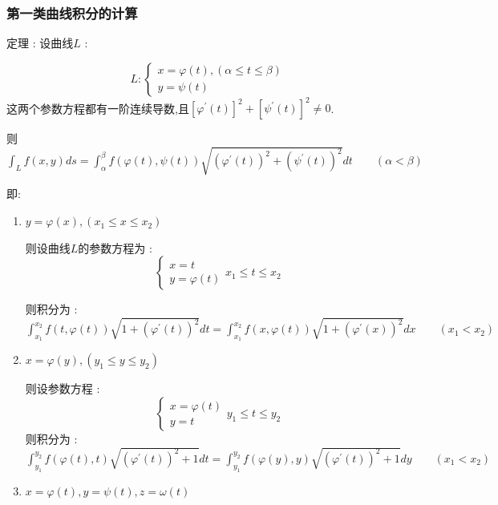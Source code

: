 \documentclass[UTF8,12pt]{ctexbook}
\newcommand{\derivative}{^\prime}
\newcommand{\defFunction}[1]{f(#1)}
\newcommand{\definiteIntegral}[2]{\int^{#1}_{#2}}
\newcommand{\pathIntegral}[1]{\int_{#1}}
\begin{document}
{{{  \subsubsection{第一类曲线积分的计算}{
    定理 : 设曲线$L$ :
    \begin{center}
      $$
        L :
        \begin{cases}
          x = \varphi(t),(\alpha \leq t \leq \beta) \\
          y = \psi(t)
        \end{cases}
      $$
      这两个参数方程都有一阶连续导数,且$\left[\varphi\derivative(t)\right]^2 + \left[\psi\derivative(t)\right]^2 \neq 0$.
    \end{center}

    则$\pathIntegral{L}\defFunction{x,y}ds = \definiteIntegral{\beta}{\alpha}\defFunction{\varphi(t),\psi(t)}\sqrt{(\varphi\derivative(t))^2 + (\psi\derivative(t))^2}dt\qquad (\alpha < \beta)$

    即:
    \begin{enumerate}
      \item {
            $y = \varphi(x),(x_1 \leq x \leq x_2)$

            则设曲线$L$的参数方程为 :
            $$
              \begin{cases}
                x = t \\
                y = \varphi(t)
              \end{cases}
              x_1 \leq t \leq x_2
            $$

            则积分为 : $\definiteIntegral{x_2}{x_1}\defFunction{t,\varphi(t)}\sqrt{1 + (\varphi\derivative(t))^2}dt = \definiteIntegral{x_2}{x_1}\defFunction{x,\varphi(t)}\sqrt{1 + (\varphi\derivative(x))^2}dx\qquad (x_1 < x_2)$
            }
      \item {
            $x = \varphi(y),(y_1 \leq y \leq y_2)$

            则设参数方程 :
            $$
              \begin{cases}
                x = \varphi(t) \\
                y = t
              \end{cases}
              y_1 \leq t \leq y_2
            $$
            则积分为 : $\definiteIntegral{y_2}{y_1}\defFunction{\varphi(t),t}\sqrt{(\varphi\derivative(t))^2 + 1}dt = \definiteIntegral{y_2}{y_1}\defFunction{\varphi(y),y}\sqrt{(\varphi\derivative(t))^2 + 1}dy\qquad (x_1 < x_2)$
            }
      \item{
            $x = \varphi(t),y = \psi(t),z = \omega(t)$

}
\end{enumerate}}}}}
\end{document}
